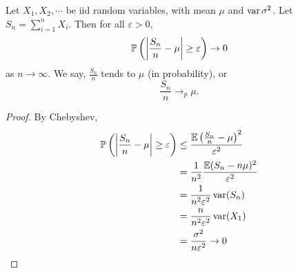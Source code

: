 %
\begin{note}
  \begin{field}
    \begin{thm}
      Let $X_1, X_2, \cdots$ be iid random variables, with mean $\mu$ and $\var \sigma^2$.
      Let $S_n = \sum_{i = 1}^n X_i$.
      Then for all $\varepsilon > 0$,
      \[
        \P\left(\left|\frac{S_n}{n} - \mu\right| \geq \varepsilon\right) \to 0
      \]
      as $n\to \infty$.
      We say, $\frac{S_n}{n}$ tends to $\mu$ (in probability), or
      \[
        \frac{S_n}{n}\to_p \mu.
      \]
    \end{thm}
  \end{field}
  \begin{field}
    \begin{proof}
      By Chebyshev,
      \begin{align*}
        \P\left(\left|\frac{S_n}{n} - \mu\right| \geq \varepsilon\right)&\leq \frac{\E\left(\frac{S_n}{n} - \mu\right)^2}{\varepsilon^2}\\
        &= \frac{1}{n^2}\frac{\E(S_n -n\mu)^2}{\varepsilon^2}\\
        &= \frac{1}{n^2\varepsilon^2}\var (S_n)\\
        &= \frac{n}{n^2\varepsilon^2}\var (X_1)\\
        &= \frac{\sigma^2}{n\varepsilon^2} \to 0\qedhere
      \end{align*}
    \end{proof}
  \end{field}
  \xplain{}%
\end{note}

